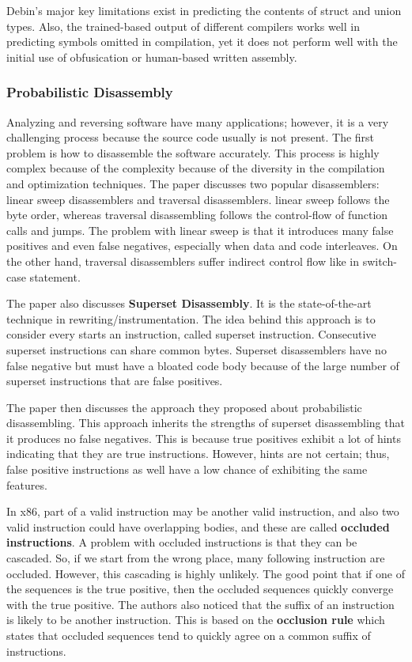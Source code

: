 \documentclass[conference,a4paper]{IEEEtran}
\begin{document}
Debin's major key limitations exist in predicting the contents of struct and union types. Also, the trained-based output of different compilers works well in predicting symbols omitted in compilation, yet it does not perform well with the initial use of obfusication or human-based written assembly.


\subsubsection{Probabilistic Disassembly}
Analyzing and reversing software have many applications; however, it is a very challenging process because the source code usually is not present. The first problem is how to disassemble the software accurately. This process is highly complex because of the complexity because of the diversity in the compilation and optimization techniques. The paper discusses two popular disassemblers: linear sweep disassemblers and traversal disassemblers. linear sweep follows the byte order, whereas traversal disassembling follows the control-flow of function calls and jumps. The problem with linear sweep is that it introduces many false positives and even false negatives, especially when data and code interleaves. On the other hand, traversal disassemblers suffer indirect control flow like in switch-case statement.

The paper also discusses \textbf{Superset Disassembly}. It is the state-of-the-art technique in rewriting/instrumentation. The idea behind this approach is to consider every starts an instruction, called superset instruction. Consecutive superset instructions can share common bytes. Superset disassemblers have no false negative but must have a bloated code body because of the large number of superset instructions that are false positives.

The paper then discusses the approach they proposed about probabilistic disassembling. This approach inherits the strengths of superset disassembling that it produces no false negatives. This is because true positives exhibit a lot of hints indicating that they are true instructions. However, hints are not certain; thus, false positive instructions as well have a low chance of exhibiting the same features.

In x86, part of a valid instruction may be another valid instruction, and also two valid instruction could have overlapping bodies, and these are called \textbf{occluded instructions}. A problem with occluded instructions is that they can be cascaded. So, if we start from the wrong place, many following instruction are occluded. However, this cascading is highly unlikely. The good point that if one of the sequences is the true positive, then the occluded sequences quickly converge with the true positive. The authors also noticed that the suffix of an instruction is likely to be another instruction. This is based on the \textbf{occlusion rule} which states that occluded sequences tend to quickly agree on a common suffix of instructions.
\end{document}
